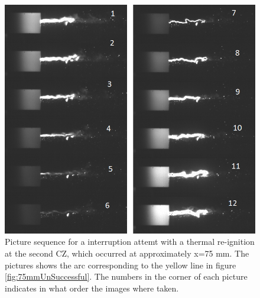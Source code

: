 \documentclass[10pt,b5paper,twoside]{article}
\begin{document}
\begin{figure}[H]
\centering
\includegraphics[scale=0.7, angle =0 ]{Bilder/Results/116_75_TR_TR.png}
\caption{Picture sequence for a interruption attemt with a thermal re-ignition at the second CZ, which occurred at approximately x=75 mm. The pictures shows the arc corresponding to the yellow line in figure \ref{fig:75mmUnSuccessful}. The numbers in the corner of each picture indicates in what order the images where taken.} \label{fig:arcingVoltage_test_116_yellow_TR}
\end{figure}
\end{document}
